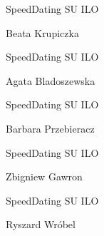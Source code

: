 \documentclass[a4paper,12pt]{article}
\begin{document}
\begin{minipage}[c]{\textwidth}
  \hline

  \hspace{0.5cm}

  SpeedDating SU ILO

  Beata Krupiczka

  \hspace{0.5cm}

  \hline
\end{minipage}



\begin{minipage}[c]{\textwidth}
  \hline

  \hspace{0.5cm}

  SpeedDating SU ILO

  Agata Bladoszewska

  \hspace{0.5cm}

  \hline
\end{minipage}



\begin{minipage}[c]{\textwidth}
  \hline

  \hspace{0.5cm}

  SpeedDating SU ILO

  Barbara Przebieracz

  \hspace{0.5cm}

  \hline
\end{minipage}



\begin{minipage}[c]{\textwidth}
  \hline

  \hspace{0.5cm}

  SpeedDating SU ILO

  Zbigniew Gawron

  \hspace{0.5cm}

  \hline
\end{minipage}



\begin{minipage}[c]{\textwidth}
  \hline

  \hspace{0.5cm}

  SpeedDating SU ILO

  Ryszard Wróbel

  \hspace{0.5cm}

  \hline
\end{minipage}
\end{document}
